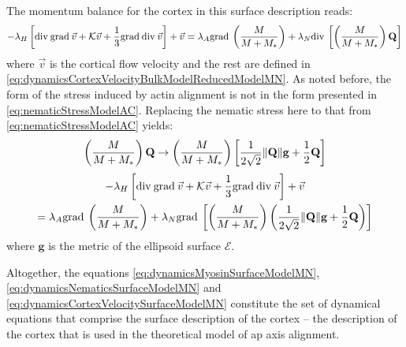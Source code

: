 The momentum balance for the cortex in this surface description reads:
\begin{equation*}
    -\lambda_H\left[\mathrm{div}\:\mathrm{grad}\:\vec{v} + \mathcal{K}\vec{v} + \frac{1}{3}\mathrm{grad}\:\mathrm{div}\:\vec{v}\right] + \vec{v} = \lambda_A\mathrm{grad}\:\left(\frac{M}{M + M_*}\right) + \lambda_N \mathrm{div}\:\left[\left(\frac{M}{M + M_*}\right) \mathbf{Q}\right]
\end{equation*}
where $\vec{v}$ is the cortical flow velocity and the rest are defined in \autoref{eq:dynamicsCortexVelocityBulkModelReducedModelMN}. As noted before, the form of the stress induced by actin alignment is not in the form presented in \autoref{eq:nematicStressModelAC}. Replacing the nematic stress here to that from \autoref{eq:nematicStressModelAC} yields:
\begin{equation*}
    \left(\frac{M}{M + M_*}\right) \mathbf{Q} \rightarrow \left(\frac{M}{M + M_*}\right)\left[\frac{1}{2\sqrt{2}}\norm{\mathbf{Q}}\mathbf{g} + \frac{1}{2}\mathbf{Q}\right]
\end{equation*}
\begin{multline}\label{eq:dynamicsCortexVelocitySurfaceModelMN}
    -\lambda_H\left[\mathrm{div}\:\mathrm{grad}\:\vec{v} + \mathcal{K}\vec{v} + \frac{1}{3}\mathrm{grad}\:\mathrm{div}\:\vec{v}\right] + \vec{v} \\= \lambda_A\mathrm{grad}\:\left(\frac{M}{M + M_*}\right) + \lambda_N \mathrm{grad}\:\left[\left(\frac{M}{M + M_*}\right)\left(\frac{1}{2\sqrt{2}}\norm{\mathbf{Q}}\mathbf{g} + \frac{1}{2}\mathbf{Q}\right)\right]    
\end{multline}
where $\mathbf{g}$ is the metric of the ellipsoid surface $\mathcal{E}$.

Altogether, the equations \autoref{eq:dynamicsMyosinSurfaceModelMN}, \autoref{eq:dynamicsNematicsSurfaceModelMN} and \autoref{eq:dynamicsCortexVelocitySurfaceModelMN} constitute the set of dynamical equations that comprise the surface description of the cortex -- the description of the cortex that is used in the theoretical model of \ac{ap} axis alignment.

